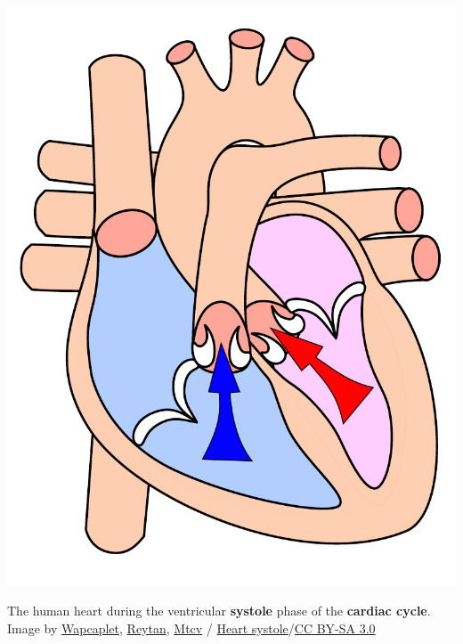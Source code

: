 \documentclass[
  letterpaper,
  DIV=11,
  numbers=noendperiod,
  oneside]{scrartcl}
\begin{document}
\begin{marginfigure}

{\centering \includegraphics{Lab3_files/mediabag/../../images/Heart_systole.pdf}

}

\caption{\label{fig-systole}The human heart during the ventricular
\textbf{systole} phase of the \textbf{cardiac cycle}. Image by
\href{https://en.wikipedia.org/wiki/User:Wapcaplet}{Wapcaplet},
\href{https://commons.wikimedia.org/wiki/User:Reytan}{Reytan},
\href{https://commons.wikimedia.org/wiki/User:Mtcv}{Mtcv} /
\href{https://commons.wikimedia.org/wiki/File:Heart_systole.svg}{Heart
systole}/\href{https://creativecommons.org/licenses/by-sa/3.0/}{CC BY-SA
3.0}}

\end{marginfigure}
\end{document}
